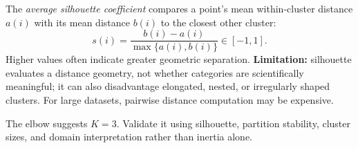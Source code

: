 The \emph{average silhouette coefficient} compares a point's mean within-cluster distance $a(i)$ with its mean distance $b(i)$ to the closest other cluster:
\[
s(i)=\frac{b(i)-a(i)}{\max\{a(i),b(i)\}}\in[-1,1].
\]
Higher values often indicate greater geometric separation. \textbf{Limitation:} silhouette evaluates a distance geometry, not whether categories are scientifically meaningful; it can also disadvantage elongated, nested, or irregularly shaped clusters. For large datasets, pairwise distance computation may be expensive.

\begin{answer}
The elbow suggests $\boxed{K=3}$. Validate it using silhouette, partition stability, cluster sizes, and domain interpretation rather than inertia alone.
\end{answer}
